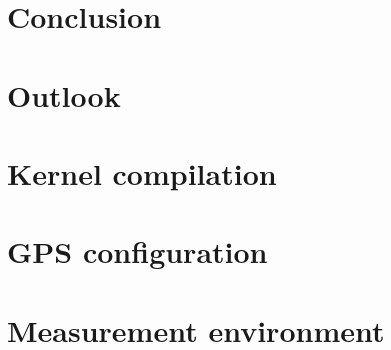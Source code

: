 \documentclass[12pt,a4paper,twoside,open=right,bibliography=totoc,BCOR=10mm]{scrreprt} %
\begin{document}
\chapter{Conclusion}
\label{ch:conclusion}


\chapter{Outlook}
\label{ch:outlook}


\cleardoublepage
{} \setcounter{page}{1}
\printbibliography

\appendix

\chapter{Kernel compilation}
\label{ap:kernel}


\chapter{GPS configuration}
\label{ap:gps}


\chapter{Measurement environment}
\label{ap:environment}

\end{document}
